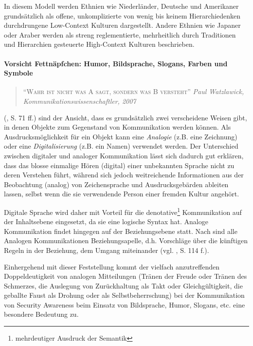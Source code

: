\documentclass[../../main.tex]{subfiles}
\begin{document}
\begin{sloppypar}
In diesem Modell werden Ethnien wie Niederländer, Deutsche und Amerikaner grundsätzlich als offene, unkomplizierte von wenig bis keinem Hierarchiedenken durchdrungene Low-Context Kulturen dargestellt. Andere Ethnien wie Japaner oder Araber werden als streng reglementierte, mehrheitlich durch Traditionen und Hierarchien gesteuerte High-Context Kulturen beschrieben. 
\end{sloppypar}

\paragraph*{Vorsicht Fettnäpfchen: Humor, Bildsprache, Slogans, Farben und Symbole}\mbox{}

\begin{sloppypar}

\begin{quote}
\textsc{"`Wahr ist nicht was A sagt, sondern was B versteht"'} \newline \newline \footnotesize{\textit{Paul Watzlawick, Kommunikationswissenschaftler, \dag{} 2007}}
\end{quote}

\citeauthor{watzlawick_menschliche_2011} (\citeyear{watzlawick_menschliche_2011}, S. 71 ff.) sind der Ansicht, dass es grundsätzlich zwei verscheidene Weisen gibt, in denen Objekte zum Gegenstand von Kommunikation werden können. Als Ausdrucksmöglichkeit für ein Objekt kann eine \textit{Analogie} (z.B. eine Zeichnung) oder eine \textit{Digitalisierung} (z.B. ein Namen) verwendet werden. Der Unterschied zwischen digitaler und analoger Kommunikation lässt sich dadurch gut erklären, dass das blosse einmalige Hören (digital) einer unbekannten Sprache nicht zu deren Verstehen führt, während sich jedoch weitreichende Informationen aus der Beobachtung (analog) von Zeichensprache und Ausdrucksgebärden ableiten lassen, selbst wenn die sie verwendende Person einer fremden Kultur angehört. 

Digitale Sprache wird daher mit Vorteil für die denotative\footnote{mehrdeutiger Ausdruck der Semantik} Kommunikation auf der Inhaltsebene eingesetzt, da sie eine logische Syntax hat. Analoge Kommunikation findet hingegen auf der Beziehungsebene statt. Nach \citeauthor{watzlawick_menschliche_2011} sind alle Analogen Kommunikationen Beziehungsapelle, d.h. Vorschläge über die künftigen Regeln in der Beziehung, dem Umgang miteinander (vgl. \citeauthor{watzlawick_menschliche_2011} \citeyear{watzlawick_menschliche_2011}, S. 114 f.).

Einhergehend mit dieser Feststellung kommt der vielfach anzutreffenden Doppeldeutigkeit von analogen Mitteilungen (Tränen der Freude oder Tränen des Schmerzes, die Auslegung von Zurückhaltung als Takt oder Gleichgültigkeit, die geballte Faust als Drohung oder als Selbstbeherrschung) bei der Kommunikation von Security Awareness beim Einsatz von Bildsprache, Humor, Slogans, etc. eine besondere Bedeutung zu.
\end{sloppypar}
\end{document}
